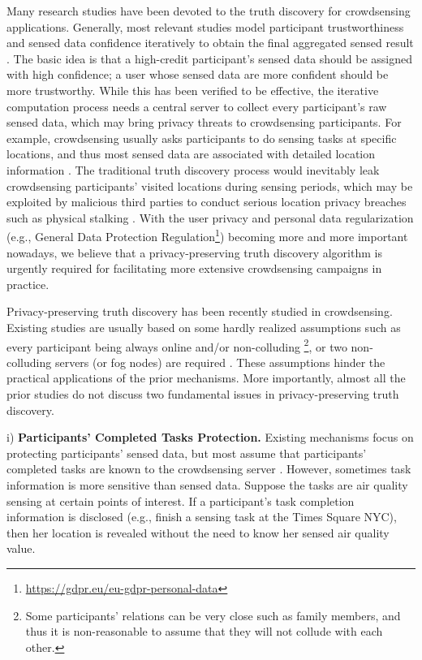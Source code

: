 \documentclass[11pt]{article}
\begin{document}
Many research studies have been devoted to the truth discovery for crowdsensing applications. Generally, most relevant studies model participant trustworthiness and sensed data confidence iteratively to obtain the final aggregated sensed result \cite{Leye-yin2008truth}. The basic idea is that a high-credit participant's sensed data should be assigned with high confidence; a user whose sensed data are more confident should be more trustworthy. While this has been verified to be effective, the iterative computation process needs a central server to collect every participant's raw sensed data, which may bring privacy threats to crowdsensing participants. For example, crowdsensing usually asks participants to do sensing tasks at specific locations, and thus most sensed data are associated with detailed location information \cite{Leye-zhang20144w1h}. The traditional truth discovery process would inevitably leak crowdsensing participants' visited locations during sensing periods, which may be exploited by malicious third parties to conduct serious location privacy breaches such as physical stalking \cite{Leye-Primault2019TheLR}. With the user privacy and personal data regularization (e.g., General Data Protection Regulation\footnote{\url{https://gdpr.eu/eu-gdpr-personal-data}}) becoming more and more important nowadays, we believe that a privacy-preserving truth discovery algorithm is urgently required for facilitating more extensive crowdsensing campaigns in practice.

Privacy-preserving truth discovery has been recently studied in crowdsensing.  Existing studies are usually based on some hardly realized assumptions such as every participant being always online and/or non-colluding \cite{Leye-Miao2015CloudEnabledPT,Leye-Miao2017ALP,Leye-Miao2019PrivacyPreservingTD}\footnote{Some participants' relations can be very close such as family members, and thus it is non-reasonable to assume that they will not collude with each other.}, or two non-colluding servers (or fog nodes) are required \cite{Leye-Tang2018NonInteractivePT,Leye-Zheng2018LearningTT,Leye-Zhang2021ReliableAP,Leye-ZHANG2020101848}. These assumptions hinder the practical applications of the prior mechanisms.
More importantly, almost all the prior studies do not discuss two fundamental issues in privacy-preserving truth discovery.

i) \textbf{Participants' Completed Tasks Protection.} Existing mechanisms focus on protecting participants' sensed data, but most assume that participants' completed tasks are known to the crowdsensing server \cite{Leye-Xu2019EfficientAP,Leye-Miao2015CloudEnabledPT,Leye-Miao2019PrivacyPreservingTD,Leye-Zheng2018LearningTT}. However, sometimes task information is more sensitive than sensed data. Suppose the tasks are air quality sensing at certain points of interest. If a participant's task completion information is disclosed (e.g., finish a sensing task at the Times Square NYC), then her location is revealed without the need to know her sensed air quality value.
\end{document}
